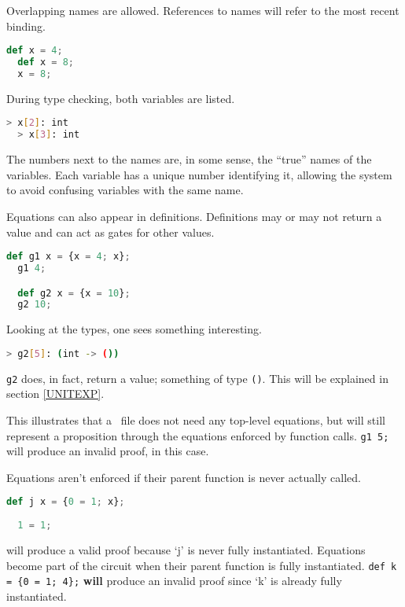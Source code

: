 Overlapping names are allowed. References to names will refer to the most recent binding.

\begin{lstlisting}[language=Python]
  def x = 4;
  def x = 8;
  x = 8;
\end{lstlisting}

During type checking, both variables are listed.

\begin{lstlisting}[language=bash]
  > x[2]: int
  > x[3]: int
\end{lstlisting}

The numbers next to the names are, in some sense, the ``true'' names of the variables. Each variable has a unique number identifying it, allowing the system to avoid confusing variables with the same name.

\label{FSTUNIT}
Equations can also appear in definitions. Definitions may or may not return a value and can act as gates for other values.

\begin{lstlisting}[language=Python]
  def g1 x = {x = 4; x};
  g1 4;

  def g2 x = {x = 10};
  g2 10;
\end{lstlisting}

Looking at the types, one sees something interesting. 

\begin{lstlisting}[language=bash]
  > g2[5]: (int -> ())
\end{lstlisting}

\lstinline{g2} does, in fact, return a value; something of type \lstinline{()}. This will be explained in section \ref{UNITEXP}.

This illustrates that a \vampir\ file does not need any top-level equations, but will still represent a proposition through the equations enforced by function calls. \lstinline{g1 5;} will produce an invalid proof, in this case.

\label{CALLREF}

Equations aren't enforced if their parent function is never actually called.

\begin{lstlisting}[language=Python]
  def j x = {0 = 1; x};
  
  1 = 1;
\end{lstlisting}

will produce a valid proof because `j' is never fully instantiated. Equations become part of the circuit when their parent function is fully instantiated. \lstinline|def k = {0 = 1; 4};| \textbf{will} produce an invalid proof since `k' is already fully instantiated.

